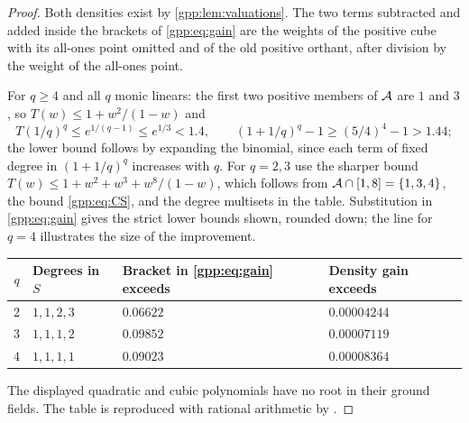 \begin{proof}
Both densities exist by \cref{gpp:lem:valuations}. The two terms subtracted and added
inside the brackets of \eqref{gpp:eq:gain} are the weights of the positive cube with its
all-ones point omitted and of the old positive orthant, after division by the weight of
the all-ones point.

For $q\ge4$ and all $q$ monic linears: the first two positive members of $\mathcal{A}$ are $1$
and $3$, so $T(w)\le1+w^2/(1-w)$ and
\[
 T(1/q)^q\le e^{1/(q-1)}\le e^{1/3}<1.4,\qquad
 (1+1/q)^q-1\ge(5/4)^4-1>1.44 ;
\]
the lower bound follows by expanding the binomial, since each term of fixed degree in
$(1+1/q)^q$ increases with $q$. For $q=2,3$ use the sharper bound
$T(w)\le1+w^2+w^3+w^8/(1-w)$, which follows from $\mathcal{A}\cap[1,8]=\{1,3,4\}$, the bound
\eqref{gpp:eq:CS}, and the degree multisets in the table. Substitution in
\eqref{gpp:eq:gain} gives the strict lower bounds shown, rounded down; the line for $q=4$
illustrates the size of the improvement.
\begin{center}
\begin{tabular}{@{}clll@{}}\toprule
$q$ & Degrees in $S$ & Bracket in \eqref{gpp:eq:gain} exceeds & Density gain exceeds\\\midrule
2 & $1,1,2,3$ & $0.06622$ & $0.00004244$\\
3 & $1,1,1,2$ & $0.09852$ & $0.00007119$\\
4 & $1,1,1,1$ & $0.09023$ & $0.00008364$\\\bottomrule
\end{tabular}
\end{center}
\gppsloppy The displayed quadratic and cubic polynomials have no root in their ground fields. The
table is reproduced with rational arithmetic by
.
\end{proof}



